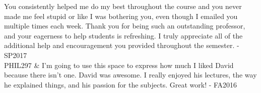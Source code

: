 \documentclass[p1noheader, 11pt, darkmode]{lightcv}
\begin{document}
\begin{dated}
    You consistently helped me do my best throughout the course and you never made me
    feel stupid or like I was bothering you, even though I emailed you multiple times each
    week. Thank you for being such an outstanding professor, and your eagerness to help
    students is refreshing. I truly appreciate all of the additional help and encouragement
    you provided throughout the semester. - SP2017\\
    PHIL297 & I’m going to use this space to express how much I liked David because there
    isn’t one. David was awesome. I really enjoyed his lectures, the way he explained
    things, and his passion for the subjects. Great work! - FA2016
\end{dated}
\end{document}
